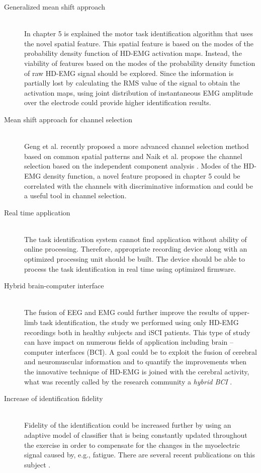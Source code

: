 \begin{description}
\item[Generalized mean shift approach] \hfill \\
	In chapter 5 is explained the motor task identification algorithm that uses the novel spatial feature. This spatial feature is based on the modes of the probability density function of HD-EMG activation maps. Instead, the viability of features based on the  modes of the probability density function of raw HD-EMG signal should be explored. Since the information is partially lost by calculating the RMS value of the signal to obtain the activation maps, using joint distribution of instantaneous EMG amplitude over the electrode could provide higher identification results.
	
\item[Mean shift approach for channel selection] \hfill \\
	Geng et al. recently proposed a more advanced channel selection method based on common spatial patterns \citep{Geng2014} and Naik et al. propose the channel selection based on the independent component analysis \citep{Naik2016}. Modes of the HD-EMG density function, a novel feature proposed in chapter 5 could be correlated with the channels with discriminative information and could be a useful tool in channel selection.

\item[Real time application] \hfill \\
	The task identification system cannot find application without ability of online processing. Therefore, appropriate recording device along with an optimized processing unit should be built. The device should be able to process the task identification in real time using optimized firmware.

\item[Hybrid brain-computer interface] \hfill \\
	The fusion of EEG and EMG could further improve the results of upper-limb task identification, the study we performed using only HD-EMG recordings both in healthy subjects and iSCI patients. This type of study can have impact on numerous fields of application including brain – computer interfaces (BCI). A goal could be to exploit the fusion of cerebral and neuromuscular information and to quantify the improvements when the innovative technique of HD-EMG is joined with the cerebral activity, what was recently called by the research community a \emph{hybrid BCI} \citep{Muller-Putz2015, Rohm2013}.

\item [Increase of identification fidelity] \hfill \\
	Fidelity of the identification could be increased further by using an adaptive model of classifier that is being constantly updated throughout the exercise in order to compensate for the changes in the myoelectric signal caused by, e.g., fatigue. There are several recent publications on this subject \citep{Hahne2015, Vidovic2016, Sensinger2009}.


\end{description}
